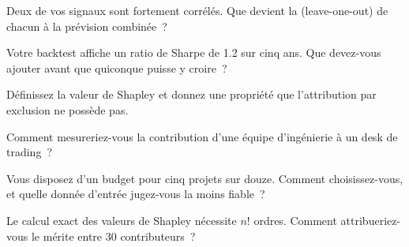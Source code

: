 \begin{interviewq}\label{iq:fm:managing-researchers-traders-and-engineers:1}
Deux de vos signaux sont fortement corrélés. Que devient la  (leave-one-out) de chacun à la prévision combinée~?
\end{interviewq}

\begin{interviewq}\label{iq:fm:managing-researchers-traders-and-engineers:2}
Votre backtest affiche un ratio de Sharpe de 1.2 sur cinq ans. Que devez-vous ajouter avant que quiconque puisse y croire~?
\end{interviewq}

\begin{interviewq}\label{iq:fm:managing-researchers-traders-and-engineers:3}
Définissez la valeur de Shapley et donnez une propriété que l'attribution par exclusion ne possède pas.
\end{interviewq}

\begin{interviewq}\label{iq:fm:managing-researchers-traders-and-engineers:4}
Comment mesureriez-vous la contribution d'une équipe d'ingénierie à un desk de trading~?
\end{interviewq}

\begin{interviewq}\label{iq:fm:managing-researchers-traders-and-engineers:5}
Vous disposez d'un budget pour cinq projets sur douze. Comment choisissez-vous, et quelle donnée d'entrée jugez-vous la moins fiable~?
\end{interviewq}

\begin{interviewq}\label{iq:fm:managing-researchers-traders-and-engineers:6}
Le calcul exact des valeurs de Shapley nécessite $n!$ ordres. Comment attribueriez-vous le mérite entre 30 contributeurs~?
\end{interviewq}
